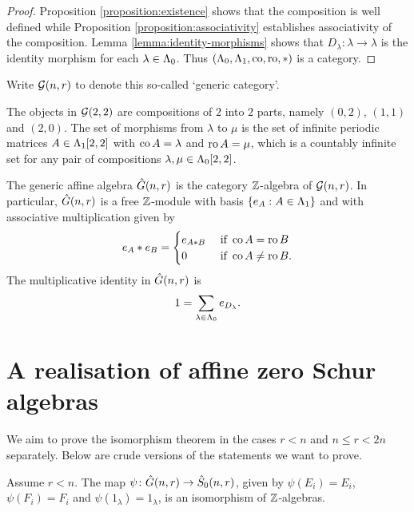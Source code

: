 \documentclass[a4paper, 11pt]{report}
\begin{document}
\begin{proof}
Proposition \ref{proposition:existence} shows that the composition is well defined while Proposition \ref{proposition:associativity} establishes associativity of the composition. Lemma \ref{lemma:identity-morphisms} shows that $D_\lambda\colon\lambda\to\lambda$ is the identity morphism for each $\lambda\in\compositions$. Thus $(\compositions,\matrices,\co,\ro,\ast)$ is a category.
\end{proof}

Write $\gcat$ to denote this so-called `generic category'.

\begin{example}
The objects in $\gcat[2,2]$ are compositions of $2$ into $2$ parts, namely $(0,2)$, $(1,1)$ and $(2,0)$. The set of morphisms from $\lambda$ to $\mu$ is the set of infinite periodic matrices $A\in\matrices[2,2]$ with $\co{A}=\lambda$ and $\ro{A}=\mu$, which is a countably infinite set for any pair of compositions $\lambda,\mu\in\compositions[2,2]$.
\end{example}

\begin{definition}\label{def:generic-algebra}
The generic affine algebra $\generic$ is the category $\integers$-algebra of $\gcat$. In particular, $\generic$ is a free $\integers$-module with basis $\{e_A:A\in\matrices\}$ and with associative multiplication given by
\begin{equation*}
e_A\ast e_B = \begin{cases}
e_{A\ast B} &\text{ if } \co{A}=\ro{B}\\
0 			&\text{ if } \co{A}\neq \ro{B}.
\end{cases}
\end{equation*}
The multiplicative identity in $\generic$ is
\begin{equation*}
1 = \sum_{\lambda\in\compositions}e_{D_\lambda}.
\end{equation*}
\end{definition}


\chapter{A realisation of affine zero Schur algebras}

We aim to prove the isomorphism theorem in the cases $r<n$ and $n\le r< 2n$ separately. Below are crude versions of the statements we want to prove.

\begin{theorem}
Assume $r<n$. The map $\psi\colon\generic\to\zeroschur$, given by $\psi(E_i)=E_i$, $\psi(F_i)=F_i$ and $\psi(1_\lambda) = 1_\lambda$, is an isomorphism of $\integers$-algebras.
\end{theorem}
\end{document}
